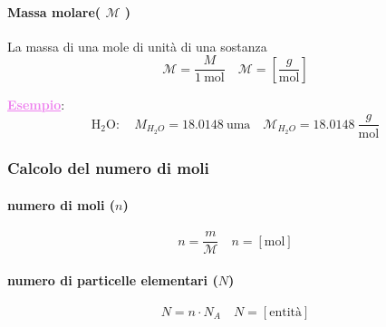 \documentclass[twoside]{article}
\begin{document}
\paragraph[long]{Massa molare( \(\mathcal{M} \) )}
La massa di una mole di unità di una sostanza
\begin{equation}
  \boxed{\mathcal{M} = \frac{M}{1\ \text{mol}}} \quad \mathcal{M} = \left[\frac{g}{\text{mol}}\right]
\end{equation}
\begin{center}
  \small
  \begin{minipage}{0.7\textwidth}
    \textcolor{violet}{\uline{\textbf{Esempio}}}:\\
    \begin{equation*}
      \text{H}_2\text{O} : \quad M_{H_{2}O} = 18.0148\ \text{uma} \quad \mathcal{M}_{H_{2}O} = 18.0148\ \frac{g}{\text{mol}}
    \end{equation*}
  \end{minipage}
\end{center}
\subsubsection{Calcolo del numero di moli}
\paragraph[short]{numero di moli (\(n\))}
\begin{equation}
  \boxed{n = \frac{m}{\mathcal{M}}} \quad n = \left[\text{mol}\right]
\end{equation}
\paragraph[short]{numero di particelle elementari (\(N\))}
\begin{equation}
  \boxed{N = n \cdot N_A} \quad N = \left[\text{entità}\right]
\end{equation}
\end{document}
